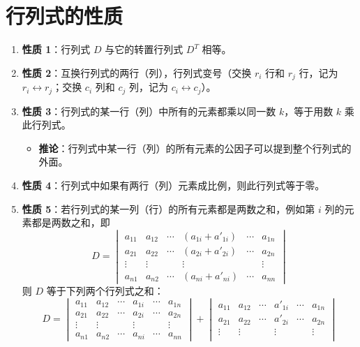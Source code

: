 \documentclass[UTF8]{ctexart}
\theoremstyle{mydef}
\begin{document}
\section{行列式的性质}

\begin{enumerate}
    \item \textbf{性质 1}：行列式 $D$ 与它的转置行列式 $D^T$ 相等。
    \item \textbf{性质 2}：互换行列式的两行（列），行列式变号（交换 $r_i$ 行和 $r_j$ 行，记为 $r_i \leftrightarrow r_j$；交换 $c_i$ 列和 $c_j$ 列，记为 $c_i \leftrightarrow c_j$）。
    \item \textbf{性质 3}：行列式的某一行（列）中所有的元素都乘以同一数 $k$，等于用数 $k$ 乘此行列式。
    \begin{itemize}
        \item \textbf{推论}：行列式中某一行（列）的所有元素的公因子可以提到整个行列式的外面。
    \end{itemize}
    \item \textbf{性质 4}：行列式中如果有两行（列）元素成比例，则此行列式等于零。
    \item \textbf{性质 5}：若行列式的某一列（行）的所有元素都是两数之和，例如第 $i$ 列的元素都是两数之和，即
    $$
    D = \begin{vmatrix}
    a_{11} & a_{12} & \cdots & (a_{1i} + a'_{1i}) & \cdots & a_{1n} \\
    a_{21} & a_{22} & \cdots & (a_{2i} + a'_{2i}) & \cdots & a_{2n} \\
    \vdots & \vdots & & \vdots & & \vdots \\
    a_{n1} & a_{n2} & \cdots & (a_{ni} + a'_{ni}) & \cdots & a_{nn}
    \end{vmatrix}
    $$
    则 $D$ 等于下列两个行列式之和：
    $$
    D = \begin{vmatrix}
    a_{11} & a_{12} & \cdots & a_{1i} & \cdots & a_{1n} \\
    a_{21} & a_{22} & \cdots & a_{2i} & \cdots & a_{2n} \\
    \vdots & \vdots & & \vdots & & \vdots \\
    a_{n1} & a_{n2} & \cdots & a_{ni} & \cdots & a_{nn}
    \end{vmatrix}
    +
    \begin{vmatrix}
    a_{11} & a_{12} & \cdots & a'_{1i} & \cdots & a_{1n} \\
    a_{21} & a_{22} & \cdots & a'_{2i} & \cdots & a_{2n} \\
    \vdots & \vdots & & \vdots & & \vdots \\

\end{vmatrix}$$
\end{enumerate}
\end{document}
